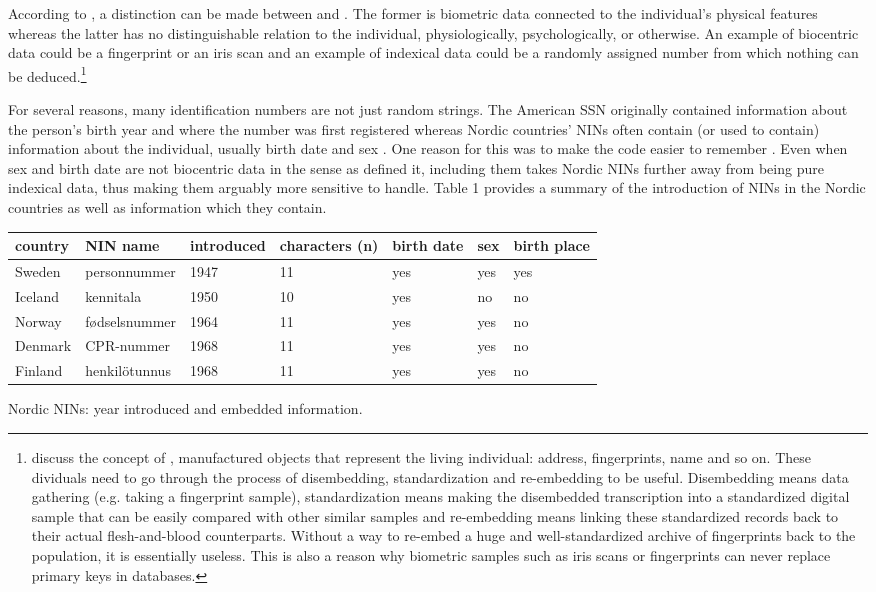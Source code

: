 According to \citet{Alterman2003}, a distinction can be made between  and . The former is biometric data connected to the individual's physical features whereas the latter has no distinguishable relation to the individual, physiologically, psychologically, or otherwise. An example of biocentric data could be a fingerprint or an iris scan and an example of indexical data could be a randomly assigned number from which nothing can be deduced.\footnote{\citet{brensinger2021} discuss the concept of , manufactured objects that represent the living individual: address, fingerprints, name and so on. These dividuals need to go through the process of disembedding, standardization and re-embedding to be useful. Disembedding means data gathering (e.g. taking a fingerprint sample), standardization means making the disembedded transcription into a standardized digital sample that can be easily compared with other similar samples and re-embedding means linking these standardized records back to their actual flesh-and-blood counterparts. Without a way to re-embed a huge and well-standardized archive of fingerprints back to the population, it is essentially useless. This is also a reason why biometric samples such as iris scans or fingerprints can never replace primary keys in databases.}

For several reasons, many identification numbers are not just random strings. The American SSN originally contained information about the person's birth year and where the number was first registered \citep[32]{brensinger2021} whereas Nordic countries' NINs often contain (or used to contain) information about the individual, usually birth date and sex \citep{watson2010, salste2021}. One reason for this was to make the code easier to remember \citep{alastalo2022}. Even when sex and birth date are not biocentric data in the sense as \citep{Alterman2003} defined it, including them takes Nordic NINs further away from being pure indexical data, thus making them arguably more sensitive to handle. Table 1 provides a summary of the introduction of NINs in the Nordic countries as well as information which they contain.

\begin{widetable}[ht]
\centering
\begin{tabular}{lllllll}
\toprule
  country & NIN name & introduced & characters (n) & birth date & sex & birth place \\
  \hline
  Sweden & personnummer & 1947 & 11 & yes & yes & yes\\
  Iceland & kennitala & 1950 & 10 & yes & no & no \\
  Norway & fødselsnummer & 1964 & 11 & yes & yes & no \\
  Denmark & CPR-nummer & 1968 & 11 & yes & yes & no \\
  Finland & henkilötunnus & 1968 & 11 & yes & yes & no \\
\bottomrule
\end{tabular}
\caption{Nordic NINs: year introduced and embedded information.}
\label{tab:nordiccomparison}
\end{widetable}


